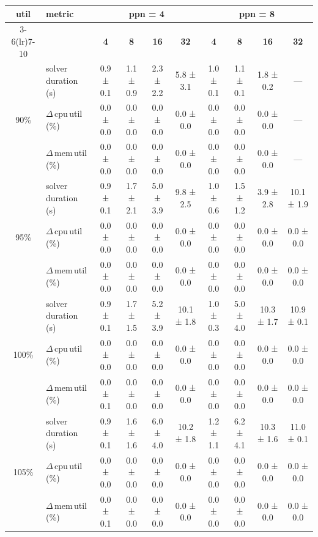 \begin{tabular}{@{}c l *{8}{c}@{}}
\toprule
\multirow{2}{*}{\textbf{util}} & \multirow{2}{*}{\textbf{metric}} &\multicolumn{4}{c}{\textbf{ppn = 4}} & \multicolumn{4}{c}{\textbf{ppn = 8}}\\
\cmidrule(lr){3-6}\cmidrule(lr){7-10}
 &  & \textbf{4} & \textbf{8} & \textbf{16} & \textbf{32} & \textbf{4} & \textbf{8} & \textbf{16} & \textbf{32}\\
\midrule
\multirow{3}{*}{90\%}
& solver\,duration\,(s) & 0.9 ± 0.1 & 1.1 ± 0.9 & 2.3 ± 2.2 & 5.8 ± 3.1 & 1.0 ± 0.1 & 1.1 ± 0.1 & 1.8 ± 0.2 & \multicolumn{1}{c}{—} \\
& $\Delta$\,cpu\,util\,(\%) & 0.0 ± 0.0 & 0.0 ± 0.0 & 0.0 ± 0.0 & 0.0 ± 0.0 & 0.0 ± 0.0 & 0.0 ± 0.0 & 0.0 ± 0.0 & \multicolumn{1}{c}{—} \\
& $\Delta$\,mem\,util\,(\%) & 0.0 ± 0.0 & 0.0 ± 0.0 & 0.0 ± 0.0 & 0.0 ± 0.0 & 0.0 ± 0.0 & 0.0 ± 0.0 & 0.0 ± 0.0 & \multicolumn{1}{c}{—} \\
\midrule
\multirow{3}{*}{95\%}
& solver\,duration\,(s) & 0.9 ± 0.1 & 1.7 ± 2.1 & 5.0 ± 3.9 & 9.8 ± 2.5 & 1.0 ± 0.6 & 1.5 ± 1.2 & 3.9 ± 2.8 & 10.1 ± 1.9 \\
& $\Delta$\,cpu\,util\,(\%) & 0.0 ± 0.0 & 0.0 ± 0.0 & 0.0 ± 0.0 & 0.0 ± 0.0 & 0.0 ± 0.0 & 0.0 ± 0.0 & 0.0 ± 0.0 & 0.0 ± 0.0 \\
& $\Delta$\,mem\,util\,(\%) & 0.0 ± 0.0 & 0.0 ± 0.0 & 0.0 ± 0.0 & 0.0 ± 0.0 & 0.0 ± 0.0 & 0.0 ± 0.0 & 0.0 ± 0.0 & 0.0 ± 0.0 \\
\midrule
\multirow{3}{*}{100\%}
& solver\,duration\,(s) & 0.9 ± 0.1 & 1.7 ± 1.5 & 5.2 ± 3.9 & 10.1 ± 1.8 & 1.0 ± 0.3 & 5.0 ± 4.0 & 10.3 ± 1.7 & 10.9 ± 0.1 \\
& $\Delta$\,cpu\,util\,(\%) & 0.0 ± 0.0 & 0.0 ± 0.0 & 0.0 ± 0.0 & 0.0 ± 0.0 & 0.0 ± 0.0 & 0.0 ± 0.0 & 0.0 ± 0.0 & 0.0 ± 0.0 \\
& $\Delta$\,mem\,util\,(\%) & 0.0 ± 0.1 & 0.0 ± 0.0 & 0.0 ± 0.0 & 0.0 ± 0.0 & 0.0 ± 0.0 & 0.0 ± 0.0 & 0.0 ± 0.0 & 0.0 ± 0.0 \\
\midrule
\multirow{3}{*}{105\%}
& solver\,duration\,(s) & 0.9 ± 0.1 & 1.6 ± 1.6 & 6.0 ± 4.0 & 10.2 ± 1.8 & 1.2 ± 1.1 & 6.2 ± 4.1 & 10.3 ± 1.6 & 11.0 ± 0.1 \\
& $\Delta$\,cpu\,util\,(\%) & 0.0 ± 0.0 & 0.0 ± 0.0 & 0.0 ± 0.0 & 0.0 ± 0.0 & 0.0 ± 0.0 & 0.0 ± 0.0 & 0.0 ± 0.0 & 0.0 ± 0.0 \\
& $\Delta$\,mem\,util\,(\%) & 0.0 ± 0.1 & 0.0 ± 0.0 & 0.0 ± 0.0 & 0.0 ± 0.0 & 0.0 ± 0.0 & 0.0 ± 0.0 & 0.0 ± 0.0 & 0.0 ± 0.0 \\
\bottomrule
\end{tabular}

